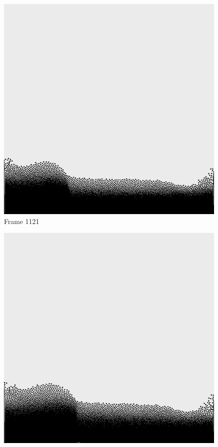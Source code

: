 \documentclass[a4paper, 12pt, oneside]{book}
\begin{document}
\begin{figure}[!ht]
    \addvspace{0.5ex}
        \begin{center}
            \includegraphics[width=\linewidth]{images/test_case_2/1121.png}
            Frame 1121
        \end{center}
    \endminipage
    \hfill
        \begin{center}
            \includegraphics[width=\linewidth]{images/test_case_2/1141.png}

\end{center}
\end{figure}
\end{document}
